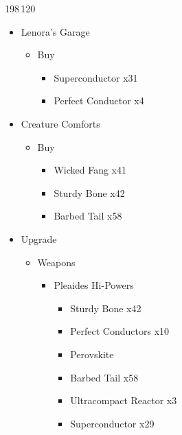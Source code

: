\begin{shop}{198\,120}
\begin{itemize}
		\item Lenora's Garage
			\begin{itemize}
				\item Buy
					\begin{itemize}
						\item Superconductor x31
						\item Perfect Conductor x4
					\end{itemize}
			\end{itemize}
		\item Creature Comforts
			\begin{itemize}
				\item Buy
					\begin{itemize}
						\item Wicked Fang x41
						\item Sturdy Bone x42
						\item Barbed Tail x58
					\end{itemize}
			\end{itemize}						
	\end{itemize}
\end{shop}

\begin{upgrade}
	\begin{itemize}
		\item Upgrade
			\begin{itemize}
				\item Weapons
					\begin{itemize}
						\item Pleaides Hi-Powers
							\begin{itemize}
								\item Sturdy Bone x42
								\item Perfect Conductors x10
								\item Perovskite
								\item Barbed Tail x58
								\item Ultracompact Reactor x3
								\item Superconductor x29
							\end{itemize}
					\end{itemize}
			\end{itemize}
	\end{itemize}
\end{upgrade}
\vfill

